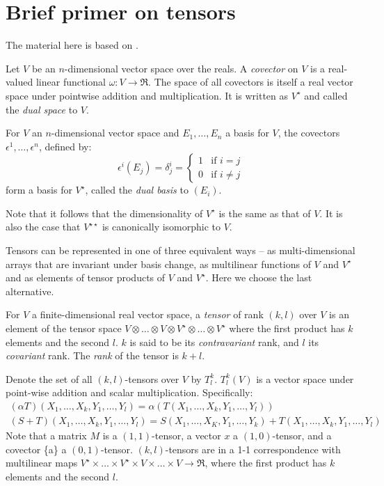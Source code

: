 \section{Brief primer on tensors}\label{sec:tensor}
The material here is based on \cite{lee-book-2000,dullemond-1991-tensor}.


Let \(V\) be an \(n\)-dimensional vector space over the reals. A {\em covector} on \(V\) is a real-valued linear functional \(\omega:V\rightarrow \Re\). The space of all covectors is itself a real vector space  under pointwise addition and multiplication. It is written as \(V^{\star}\) and called the {\em dual space} to \(V\). 

\begin{proposition} For \(V\) an \(n\)-dimensional vector space and \(E_1, \ldots, E_n\) a basis for \(V\), the covectors \(\epsilon^1, \ldots, \epsilon^n\), defined by:
  \[
  \epsilon^i(E_j) = \delta^i_j = \left\{
  \begin{array}{ll}
    1 & \mbox{if \(i =j\)} \\
    0 & \mbox{if \(i\not=j\)}
    \end{array}\right.
    \]
\noindent form a basis for \(V^{\star}\), called the {\em dual basis} to \((E_i)\).   
\end{proposition}
Note that it follows that the dimensionality of \(V^{\star}\) is the same as that of \(V\). It is also the case that \(V^{\star\star}\) is canonically isomorphic to \(V\). 

Tensors can be represented in one of three equivalent ways -- as multi-dimensional arrays that are invariant under basis change, as multilinear functions of \(V\) and \(V^{\star}\) and as elements of tensor products of \(V\) and \(V^{\star}\). Here we choose the last alternative. 

\begin{definition}[Tensor] For $V$ a finite-dimensional real vector space, a {\em tensor} of rank \((k,l)\) over $V$ is an element of the tensor space \(V\otimes \ldots \otimes V \otimes V^{\star}\otimes \ldots \otimes V^{\star}\) where the first product has \(k\) elements and the second \(l\). \(k\) is said to be its {\em contravariant} rank, and \(l\) its {\em covariant} rank. The {\em rank} of the tensor is \(k+l\).
\end{definition}
Denote the set of all \((k,l)\)-tensors over \(V\) by \(T^k_l\).
$T^k_l(V)$ is a vector space under point-wise addition and scalar multiplication. Specifically:
\[
\begin{array}{l}
  (\alpha T)(X_1, \ldots, X_k, Y_1, \ldots, Y_l) = \alpha(T(X_1, \ldots, X_k, Y_1, \ldots, Y_l))\\
  (S+T)(X_1, \ldots, X_k, Y_1, \ldots, Y_l)=S(X_1, \ldots, X_K, Y_1, \ldots, Y_k) + T(X_1, \ldots, X_k, Y_1, \ldots, Y_l)
\end{array}
\]
Note that a matrix \(M\) is a \((1,1)\)-tensor, a vector \(x\) a \((1,0)\)-tensor, and a covector \{a\} a \((0,1)\)-tensor. \((k,l)\)-tensors are in a 1-1 correspondence with multilinear maps \(V^{\star}\times \ldots \times V^{\star} \times V \times \ldots \times V \rightarrow \Re\), where the first product has \(k\) elements and the second \(l\).


